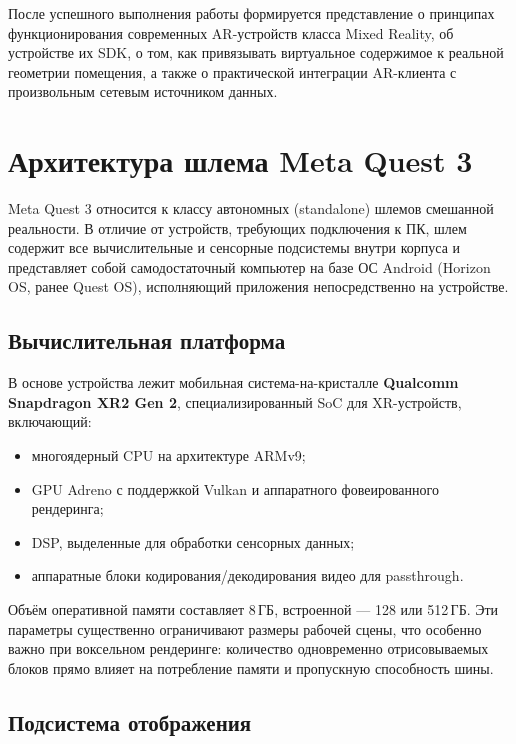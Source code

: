 \documentclass[a4paper,12pt]{article}
\begin{document}
После успешного выполнения работы формируется представление о принципах функционирования современных AR-устройств класса Mixed Reality, об устройстве их SDK, о том, как привязывать виртуальное содержимое к реальной геометрии помещения, а также о практической интеграции AR-клиента с произвольным сетевым источником данных.



\section*{Архитектура шлема Meta Quest 3}

Meta Quest 3 относится к классу автономных (standalone) шлемов смешанной реальности. В отличие от устройств, требующих подключения к ПК, шлем содержит все вычислительные и сенсорные подсистемы внутри корпуса и представляет собой самодостаточный компьютер на базе ОС Android (Horizon OS, ранее Quest OS), исполняющий приложения непосредственно на устройстве.

\subsection*{Вычислительная платформа}

В основе устройства лежит мобильная система-на-кристалле \textbf{Qualcomm Snapdragon XR2 Gen 2}, специализированный SoC для XR-устройств, включающий:

\begin{itemize}
    \item многоядерный CPU на архитектуре ARMv9;
    \item GPU Adreno с поддержкой Vulkan и аппаратного фовеированного рендеринга;
    \item DSP, выделенные для обработки сенсорных данных;
    \item аппаратные блоки кодирования/декодирования видео для passthrough.
\end{itemize}

Объём оперативной памяти составляет 8\,ГБ, встроенной --- 128 или 512\,ГБ. Эти параметры существенно ограничивают размеры рабочей сцены, что особенно важно при воксельном рендеринге: количество одновременно отрисовываемых блоков прямо влияет на потребление памяти и пропускную способность шины.

\subsection*{Подсистема отображения}
\end{document}
